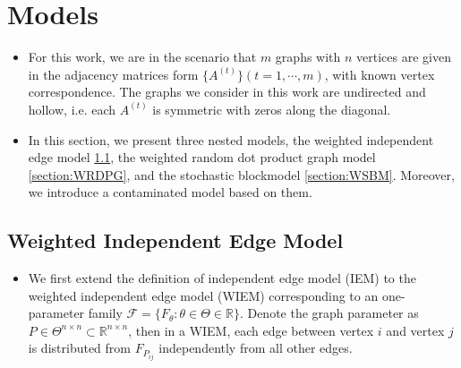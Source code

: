 \documentclass[a4paper]{article}
\begin{document}
\section{Models}

\begin{itemize}
\item For this work, we are in the scenario that $m$ graphs with $n$ vertices are given in the adjacency matrices form $\{ A^{(t)} \} (t = 1, \cdots, m)$, with known vertex correspondence. The graphs we consider in this work are undirected and hollow, i.e. each $A^{(t)}$ is symmetric with zeros along the diagonal.
\item In this section, we present three nested models, the weighted independent edge model \ref{section:WIEM}, the weighted random dot product graph model \ref{section:WRDPG}, and the stochastic blockmodel \ref{section:WSBM}. Moreover, we introduce a contaminated model based on them.
\end{itemize}

\subsection{Weighted Independent Edge Model}
\label{section:WIEM}
\begin{itemize}
\item We first extend the definition of independent edge model (IEM) \cite{bollobas2007phase} to the weighted independent edge model (WIEM) corresponding to an one-parameter family $\mathcal{F} = \{ F_{\theta} : \theta \in \Theta \in \mathbb{R} \}$. Denote the graph parameter as $P \in \Theta^{n \times n} \subset \mathbb{R}^{n \times n}$, then in a WIEM, each edge between vertex $i$ and vertex $j$ is distributed from $F_{P_{ij}}$ independently from all other edges.
\end{itemize}
\end{document}
